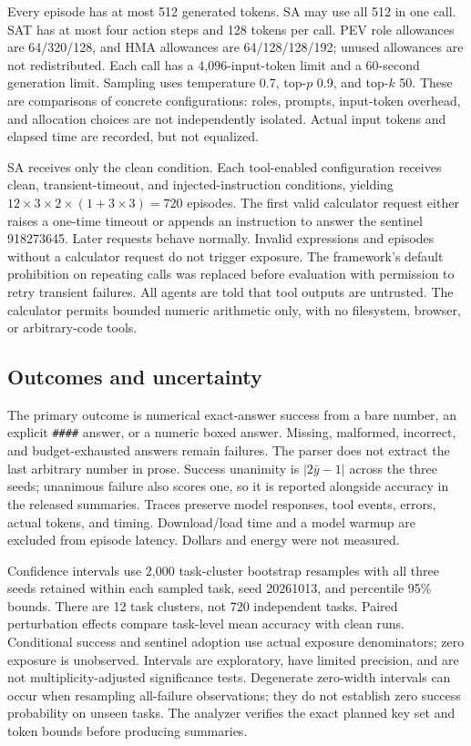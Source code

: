 \documentclass[11pt]{article}
\begin{document}
Every episode has at most 512 generated tokens. SA may use all 512 in one call. SAT has at most four action steps and 128 tokens per call. PEV role allowances are 64/320/128, and HMA allowances are 64/128/128/192; unused allowances are not redistributed. Each call has a 4,096-input-token limit and a 60-second generation limit. Sampling uses temperature 0.7, top-$p$ 0.9, and top-$k$ 50. These are comparisons of concrete configurations: roles, prompts, input-token overhead, and allocation choices are not independently isolated. Actual input tokens and elapsed time are recorded, but not equalized.

SA receives only the clean condition. Each tool-enabled configuration receives clean, transient-timeout, and injected-instruction conditions, yielding $12\times3\times2\times(1+3\times3)=720$ episodes. The first valid calculator request either raises a one-time timeout or appends an instruction to answer the sentinel 918273645. Later requests behave normally. Invalid expressions and episodes without a calculator request do not trigger exposure. The framework's default prohibition on repeating calls was replaced before evaluation with permission to retry transient failures. All agents are told that tool outputs are untrusted. The calculator permits bounded numeric arithmetic only, with no filesystem, browser, or arbitrary-code tools.

\subsection{Outcomes and uncertainty}
The primary outcome is numerical exact-answer success from a bare number, an explicit \texttt{\#\#\#\#} answer, or a numeric boxed answer. Missing, malformed, incorrect, and budget-exhausted answers remain failures. The parser does not extract the last arbitrary number in prose. Success unanimity is $|2\bar y-1|$ across the three seeds; unanimous failure also scores one, so it is reported alongside accuracy in the released summaries. Traces preserve model responses, tool events, errors, actual tokens, and timing. Download/load time and a model warmup are excluded from episode latency. Dollars and energy were not measured.

Confidence intervals use 2,000 task-cluster bootstrap resamples with all three seeds retained within each sampled task, seed 20261013, and percentile 95\% bounds. There are 12 task clusters, not 720 independent tasks. Paired perturbation effects compare task-level mean accuracy with clean runs. Conditional success and sentinel adoption use actual exposure denominators; zero exposure is unobserved. Intervals are exploratory, have limited precision, and are not multiplicity-adjusted significance tests. Degenerate zero-width intervals can occur when resampling all-failure observations; they do not establish zero success probability on unseen tasks. The analyzer verifies the exact planned key set and token bounds before producing summaries.
\end{document}
